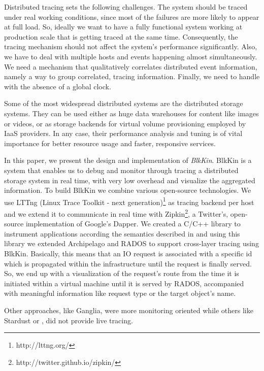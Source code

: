 \documentclass[a4paper,10pt,twocolumn]{article}
\begin{document}
Distributed tracing sets the following challenges. The system should be traced
under real working conditions, since most of the failures are more likely to
appear at full load. So, ideally we want to have a fully functional system
working at production scale that is getting traced at the same time.
Consequently, the tracing mechanism should not affect the system's performance
significantly.  Also, we have to deal with multiple hosts and events happening
almost simultaneously. We need a mechanism that qualitatively correlates
distributed event information, namely a way to group correlated, tracing
information. Finally, we need to handle with the absence of a global clock.

Some of the most widespread distributed systems are the distributed storage
systems. They can be used either as huge data warehouses for content like images
or videos, or as storage backends for virtual volume provisioning employed by
IaaS providers. In any case, their performance analysis and tuning is of vital
importance for better resource usage and faster, responsive services.

In this paper, we present the design and implementation of \emph{BlkKin}.
BlkKin is a system that enables us to debug and monitor through tracing a
distributed storage system in real time, with very low overhead and visualize
the aggregated information. To build BlkKin we combine various open-source
technologies. We use LTTng (Linux Trace Toolkit - next
generation)\footnote{http://lttng.org/} as tracing backend per host and we
extend it to communicate in real time with
Zipkin\footnote{http://twitter.github.io/zipkin/}, a Twitter's, open-source
implementation of Google's Dapper\cite{dapper}. We created a C/C++ library
to instrument applications according the semantics described in \cite{dapper}
and using this library we extended Archipelago\cite{archip} and
RADOS\cite{rados} to support cross-layer tracing using BlkKin. Basically, this
means that an IO request is associated with a specific id which is propagated
within the infrastructure until the request is finally served. So, we end up
with a visualization of the request's route from the time it is initiated
within a virtual machine until it is served by RADOS, accompanied with
meaningful information like request type or the target object's name.

Other approaches, like Ganglia\cite{ganglia}, were more monitoring oriented
while others like Stardust\cite{stardust} or \cite{hp}, did not provide live
tracing.
 
\end{document}
